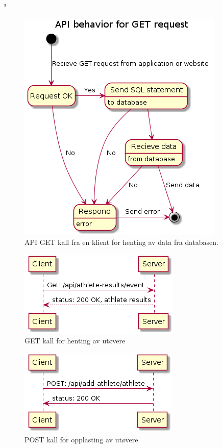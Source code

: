 ⁵\documentclass[norsk]{article}
\begin{document}
\begin{figure}[H]
\centering 
    \includegraphics[scale=0.7]{images/state-api-get.png}
    \caption{API GET kall fra en klient for henting av data fra databasen.}\label{fig:state-api-get}
\end{figure}
\begin{figure}[H]
\centering 
    \includegraphics[scale=0.7]{images/get-athletes-api-call.png}
    \caption{GET kall for henting av utøvere}\label{fig:get-at-api}
\end{figure}
\begin{figure}[H]
\centering 
    \includegraphics[scale=0.7]{images/post-athletes-api-call.png}
    \caption{POST kall for opplasting av utøvere}\label{fig:post-at-api}
\end{figure}
\end{document}
